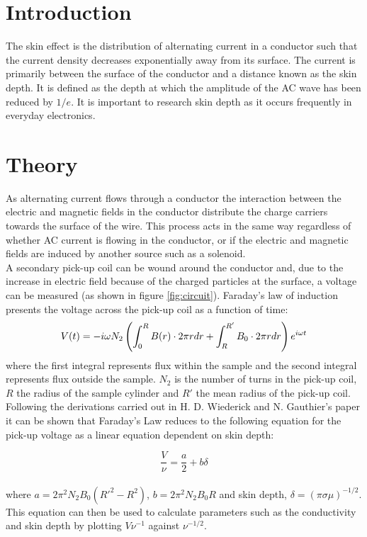 \documentclass[a4paper,12pt,twocolumn]{article}
\let\cite=\supercite
\begin{document}
\section{Introduction}
	The skin effect is the distribution of alternating current in a conductor such that the current density decreases exponentially away from its surface. The current is primarily between the surface of the conductor and a distance known as the skin depth. It is defined as the depth at which the amplitude of the AC wave has been reduced by $1/e$\cite{geosci}. It is important to research skin depth as it occurs frequently in everyday electronics.
	
\section{Theory}

	As alternating current flows through a conductor the interaction between the electric and magnetic fields in the conductor distribute the charge carriers towards the surface of the wire\cite{hyperPhysics}. This process acts in the same way regardless of whether AC current is flowing in the conductor, or if the electric and magnetic fields are induced by another source such as a solenoid\cite{jackson}.\\
	
	A secondary pick-up coil can be wound around the conductor and, due to the increase in electric field because of the charged particles at the surface, a voltage can be measured (as shown in figure \ref{fig:circuit}). Faraday's law of induction presents the voltage across the pick-up coil as a function of time\cite{jackson}:
	\begin{equation}
		\scriptsize
		V(t) = - i \omega N_2 \left( \int_{0}^{R} B(r) \cdot 2\pi r dr + \int_{R}^{R'} B_0 \cdot 2\pi r dr \right) e^{i\omega t}
		\label{eq:faraday}
	\end{equation}
	where the first integral represents flux within the sample and the second integral represents flux outside the sample. $N_2$ is the number of turns in the pick-up coil, $R$ the radius of the sample cylinder and $R'$ the mean radius of the pick-up coil.\\
	
	Following the derivations carried out in H. D. Wiederick and N. Gauthier's paper\cite{manual} it can be shown that Faraday's Law reduces to the following equation for the pick-up voltage as a linear equation dependent on skin depth:
	
	\begin{equation}
		\frac{V}{\nu} = \frac{a}{2} + b\delta
		\label{eq:line}
	\end{equation}\\
	where $a = 2\pi^2 N_2 B_0 (R'^2-R^2)$, $b = 2\pi^2 N_2 B_0 R$ and skin depth, $\delta = (\pi \sigma \mu)^{-1/2}$. This equation can then be used to calculate parameters such as the conductivity and skin depth by plotting $V\nu^{-1}$ against $\nu^{-1/2}$.\\
	
\end{document}
